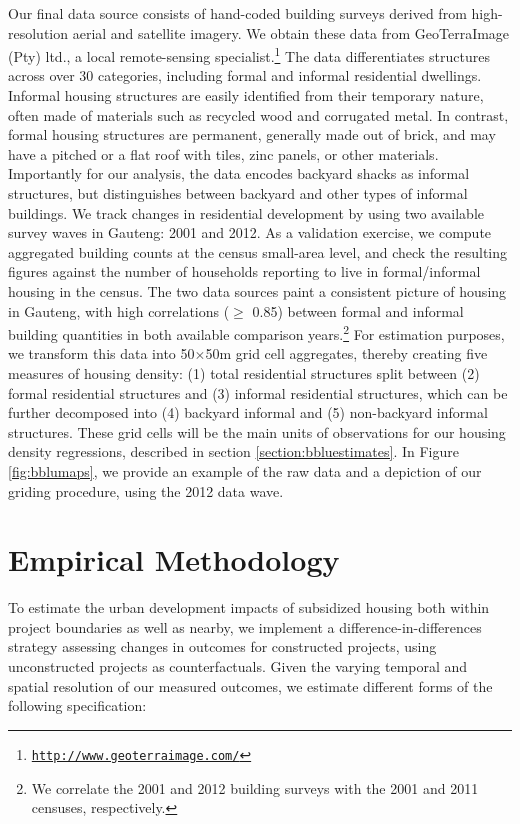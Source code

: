 \documentclass[12pt]{article}
\begin{document}
Our final data source consists of hand-coded building surveys derived from high-resolution aerial and satellite imagery. We obtain these data from GeoTerraImage (Pty) ltd., a local remote-sensing specialist.\footnote{\href{http://www.geoterraimage.com/}{\tt http://www.geoterraimage.com/}} The data differentiates structures across over 30 categories, including formal and informal residential dwellings. Informal housing structures are easily identified from their temporary nature, often made of materials such as recycled wood and corrugated metal. In contrast, formal housing structures are permanent, generally made out of brick, and may have a pitched or a flat roof with tiles, zinc panels, or other materials. Importantly for our analysis, the data encodes backyard shacks as informal structures, but distinguishes between backyard and other types of informal buildings. We track changes in residential development by using two available survey waves in Gauteng: 2001 and 2012. As a validation exercise, we compute aggregated building counts at the census small-area level, and check the resulting figures against the number of households reporting to live in formal/informal housing in the census. The two data sources paint a consistent picture of housing in Gauteng, with high correlations ($\geq$ 0.85) between formal and informal building quantities in both available comparison years.\footnote{We correlate the 2001 and 2012 building surveys with the 2001 and 2011 censuses, respectively.} For estimation purposes, we transform this data into 50$\times$50m grid cell aggregates, thereby creating five measures of housing density: (1) total residential structures split between (2) formal residential structures and (3) informal residential structures, which can be further decomposed into (4) backyard informal and (5) non-backyard informal structures.  These grid cells will be the main units of observations for our housing density regressions, described in section \ref{section:bbluestimates}. In Figure \ref{fig:bblumaps}, we provide an example of the raw data and a depiction of our griding procedure, using the 2012 data wave.

\section{Empirical Methodology}\label{section:methodology}

To estimate the urban development impacts of subsidized housing both within project boundaries as well as nearby, we implement a difference-in-differences strategy assessing changes in outcomes for constructed projects, using unconstructed projects as counterfactuals. Given the varying temporal and spatial resolution of our measured outcomes, we estimate different forms of the following specification:
\end{document}
